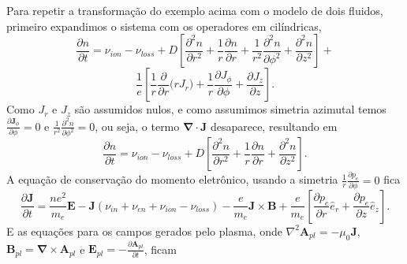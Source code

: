 \documentclass[12pt,oneside,a4paper]{abntex2}
\begin{document}
Para repetir a transformação do exemplo acima com o modelo de dois fluidos, primeiro expandimos o sistema com os operadores em cilíndricas, %
\begin{equation}
\frac{\partial n}{\partial t} = \nu_{ion} - \nu_{loss}+D \left[  \frac{\partial^2 n}{\partial r^2} + \frac{1}{r} \frac{\partial n}{\partial r} + \frac{1}{r^2} \frac{\partial^2 n}{\partial \phi^2}  + \frac{\partial^2 n}{\partial z^2} \right] + 
\end{equation}
\begin{equation}
\frac{1}{e}  \left[ \frac{1}{r}  \frac{\partial }{\partial r}\Big(r J_r\Big) + \frac{1}{r} \frac{\partial J_\phi}{\partial \phi} +  \frac{\partial J_z}{\partial z} \right] .
\end{equation}
Como $J_r$ e $J_z$ são assumidos nulos, e como assumimos simetria azimutal temos $\frac{\partial \bm{J}_\phi}{\partial \phi} = 0$ e $ \frac{1}{r^2} \frac{\partial^2 n}{\partial \phi^2}=0$, ou seja, o termo $\bm{\nabla} \cdot \bm{J}$ desaparece, resultando em
\begin{equation}
\frac{\partial n}{\partial t} = \nu_{ion} - \nu_{loss}+D \left[  \frac{\partial^2 n}{\partial r^2} + \frac{1}{r} \frac{\partial n}{\partial r}  + \frac{\partial^2 n}{\partial z^2} \right] .
\end{equation}
A equação de conservação do momento eletrônico, usando a simetria  $\frac{1}{r} \frac{\partial p_e}{\partial \phi}  = 0$ fica
\begin{equation}
\label{momenteletrico1} 
\frac{\partial \bm{J}}{\partial t} =  \frac{ne^2}{m_e} \bm{E} -\bm{J}(\nu_{in}+\nu_{en}+\nu_{ion}-\nu_{loss}) -\frac{e}{m_e}\bm{J} \times \bm{B}+\frac{e}{m_e} \left[ \frac{\partial p_e}{\partial r} \hat{e}_r + \frac{\partial p_e}{\partial z} \hat{e}_z \right] .
\end{equation}
E as equações para os campos gerados pelo plasma, onde $\nabla^2 \bm{A}_{pl}=-\mu_0\bm{J}$, $ \bm{B}_{pl} = \bm{\nabla} \times \bm{A}_{pl}$ e $\bm{E}_{pl}=-\frac{\partial \bm{A}_{pl}}{\partial t} $, ficam%
\end{document}
